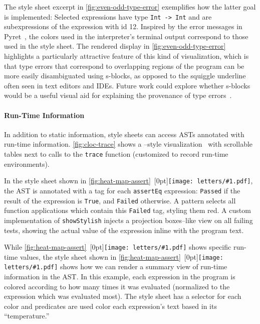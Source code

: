 \documentclass[acmsmall, screen]{acmart}
\newcommand{\parahead}[1]
  {\paragraph{\textbf{#1}}}
\newcommand{\figBubble}[1]{\raisebox{-0.03in}[0pt]{\texttt{[image: letters/\#1.pdf]}}}
\newcommand{\refBubble}[1]
  {~\figBubble{#1}}
\begin{document}
The  style sheet excerpt in \autoref{fig:even-odd-type-error} exemplifies how the latter goal is implemented: Selected expressions have type \mbox{\texttt{Int -> Int}} and are subexpressions of the expression with id 12.
Inspired by the error messages in Pyret~\citep{Pyret}, the colors used in the interpreter's terminal output correspond to those used in the style sheet.
The rendered display in \autoref{fig:even-odd-type-error} highlights a particularly attractive feature of this kind of visualization, which is that type errors that correspond to overlapping regions of the program can be more easily disambiguated using s-blocks, as opposed to the squiggle underline often seen in text editors and IDEs.
Future work could explore whether s-blocks would be a useful visual aid for explaining the provenance of type errors~\citep{Bhanuka2023,Zhao2024}.













\parahead{Run-Time Information}

In addition to static information, style sheets can access ASTs annotated with run-time information.
\autoref{fig:cloc-trace} shows a --style visualization~\cite{Lerner2020} with scrollable tables next to calls to the \texttt{trace} function (customized to record run-time environments).



In the  style sheet shown in \autoref{fig:heat-map-assert}\refBubble{a}, the AST is annotated with a tag for each \texttt{assertEq} expression: \texttt{Passed} if the result of the expression is \texttt{True}, and \texttt{Failed} otherwise.
A pattern selects all function applications which contain this \texttt{Failed} tag, styling them red.
A custom implementation of \texttt{showStylish} injects a projection boxes--like view on all failing tests, showing the actual value of the expression inline with the program text.




While \autoref{fig:heat-map-assert}\refBubble{a} shows specific run-time values, the  style sheet shown in \autoref{fig:heat-map-assert}\refBubble{b} shows how we can render a summary view of run-time information in the AST.
In this example, each expression in the program is colored according to how many times it was evaluated (normalized to the expression which was evaluated most).
The style sheet has a selector for each color and predicates are used color each expression's text based in its ``temperature.''
\end{document}
